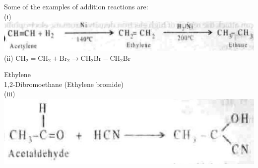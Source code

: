 \documentclass[10pt]{article}
\begin{document}
Some of the examples of addition reactions are:\\
(i)\\
\includegraphics[max width=\textwidth, center]{2025_01_28_8470952b98110cec3aabg-094(2)}\\
(ii) $\mathrm{CH}_{2}=\mathrm{CH}_{2}+\mathrm{Br}_{2} \longrightarrow \mathrm{CH}_{2} \mathrm{Br}-\mathrm{CH}_{2} \mathrm{Br}$

Ethylene\\
1,2-Dibromoethane (Ethylene bromide)\\
(iii)\\
\includegraphics[max width=\textwidth, center]{2025_01_28_8470952b98110cec3aabg-095(1)}
\end{document}
